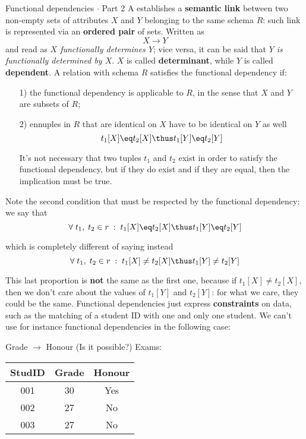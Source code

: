 \begin{definition}{Functional dependencies $\cdot$ Part 2}
    A \textbf{} establishes a \textbf{semantic link} between two non-empty sets of attributes $X$ and $Y$ belonging to the same schema $R$: such link is represented via an \textbf{ordered pair} of sets. Written as
    \[ X \rightarrow Y \]
    and read as \textit{$X$ functionally determines $Y$}; vice versa, it can be said that \textit{$Y$ is functionally determined by $X$}. $X$ is called \textbf{determinant}, while $Y$ is called \textbf{dependent}. A relation with schema $R$ satisfies the functional dependency if:
    \begin{itemize}
        \item [1)] the functional dependency is applicable to $R$, in the sense that $X$ and $Y$ are subsets of $R$;
        \item [2)] ennuples in $R$ that are identical on $X$ have to be identical on $Y$ as well
        \[ t_1[X] \eq t_2[X] \thus t_1[Y] \eq t_2[Y]\]

        It's not necessary that two tuples $t_1$ and $t_2$ exist in order to satisfy the functional dependency, but if they do exist and if they are equal, then the implication must be true.
    \end{itemize}
\end{definition}

Note the second condition that must be respected by the functional dependency: we say that
\[ \forall \; t_1, \; t_2 \in r \; : \; t_1[X] \eq t_2[X] \thus t_1[Y] \eq t_2[Y] \]

which is completely different of saying instead
\[ \forall \; t_1, \; t_2 \in r \; : \; t_1[X] \neq t_2[X] \thus t_1[Y] \neq t_2[Y] \]

This last proportion is \textbf{not} the same as the first one, because if $t_1[X] \neq t_2[X]$, then we don't care about the values of $t_1[Y]$ and $t_2[Y]$: for what we care, they could be the same. Functional dependencies just express \textbf{constraints} on data, such as the matching of a student ID with one and only one student. We can't use for instance functional dependencies in the following case:
\begin{center}
    Grade $\rightarrow$ Honour (Is it possible?) \quad \quad Exams: \quad
    \begin{tabular}{|c|c|c|}
        \hline \rowcolor{maindoccol!60}
        \textbf{StudID} & \textbf{Grade} & \textbf{Honour} \\
        \hline
        001 & 30 & Yes \\
        \hline
        002 & 27 & No \\
        \hline
        003 & 27 & No \\
        \hline
    \end{tabular}
\end{center}


